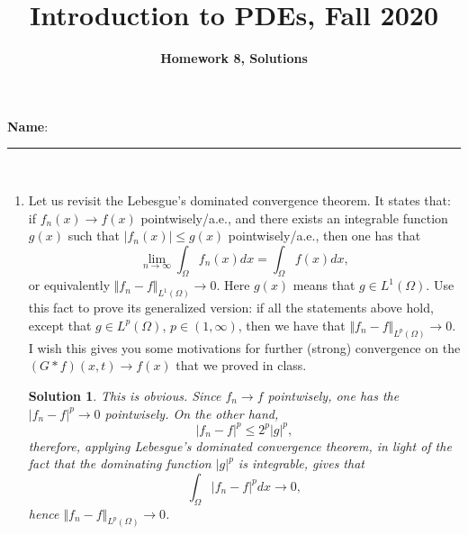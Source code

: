 \documentclass[6pt]{article}
\title{Introduction to PDEs, Fall 2020}
\author{\textbf{Homework 8, Solutions}}
\date{}
\newtheorem{solution}{Solution}
\numberwithin{equation}{section}
\begin{document}
\maketitle

\textbf{Name}:\rule{1 in}{0.001 in} \\
\begin{enumerate}
\item Let us revisit the Lebesgue's dominated convergence theorem.  It states that: if $f_n(x)\rightarrow f(x)$ pointwisely/a.e., and there exists an integrable function $g(x)$ such that $|f_n(x)|\leq g(x)$ pointwisely/a.e., then one has that
    \[\lim_{n\rightarrow \infty} \int_\Omega f_n(x)dx=\int_\Omega f(x)dx,\]
    or equivalently $\Vert f_n-f\Vert_{L^1(\Omega)}\rightarrow 0$.  Here $g(x)$ means that $g\in L^1(\Omega)$.  Use this fact to prove its generalized version: if all the statements above hold, except that $g\in L^p(\Omega)$, $p\in(1,\infty)$, then we have that $\Vert f_n-f\Vert_{L^p(\Omega)}\rightarrow 0$.  I wish this gives you some motivations for further (strong) convergence on the $(G*f)(x,t)\rightarrow f(x)$ that we proved in class.
\begin{solution}
This is obvious.  Since $f_n\rightarrow f$ pointwisely, one has the $|f_n-f|^p\rightarrow 0$ pointwisely.  On the other hand,
\[|f_n-f|^p\leq 2^p |g|^p,\]
therefore, applying Lebesgue's dominated convergence theorem, in light of the fact that the dominating function $|g|^p$ is integrable, gives that
\[\int_\Omega |f_n-f|^pdx\rightarrow 0,\]
hence $\Vert f_n-f\Vert_{L^p(\Omega)}\rightarrow 0$.
\end{solution}



\end{enumerate}
\end{document}
